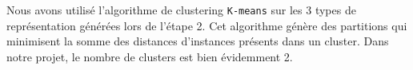 Nous avons utilisé l'algorithme de clustering \texttt{K-means} sur les 3 types de représentation générées lors de l'étape 2. Cet algorithme génère des partitions qui minimisent la somme des distances d'instances présents dans un cluster. Dans notre projet, le nombre de clusters est bien évidemment 2.    